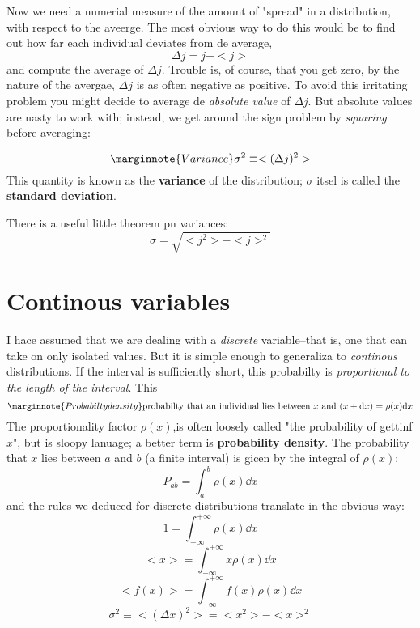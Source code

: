 Now we need a numerial measure of the amount of "spread" in a distribution, with respect to the aveerge. The most obvious way to do this would be to find out how far each individual deviates from de average,
\begin{equation}\label{1.10}
	\Delta j=j-<j>
\end{equation}
and compute the average of $\Delta j$. Trouble is, of course, that you get zero, by the nature of the avergae, $\Delta j$ is as often negative as positive. To avoid this irritating problem you might decide to average de \textit{absolute value} of $\Delta j$. But absolute values are nasty to work with; instead, we get around the sign problem by \textit{squaring} before averaging:

\begin{equation}\label{1.11}\marginnote{Variance}
	\sigma^2\equiv <(\Delta j)^2>
\end{equation}
This quantity is known as the \textbf{variance} of the distribution; $\sigma$ itsel is called the \textbf{standard deviation}. 

There is a useful little theorem pn variances:
\begin{equation}\label{1.12}
	\sigma=\sqrt{<j^2> - <j>^2}
\end{equation}

\section{Continous variables}
I hace assumed that we are dealing with a \textit{discrete} variable--that is, one that can take on only isolated values. But it is simple enough to generaliza to \textit{continous} distributions. If the interval is sufficiently short, this probabilty is \textit{proportional to the length of the interval}. This
\begin{equation}\label{1.14}\marginnote{Probabilty density}
	\mbox{{probabilty that an individual lies between $x$ and $(x+\dd x)$}}=\rho(x)\dd x
\end{equation}
The proportionality factor $\rho(x)$,is often loosely called "the probability of gettinf $x$", but is sloopy lanuage; a better term is \textbf{probability density}. The probability that $x$ lies between $a$ and $b$ (a finite interval) is gicen by the integral of $\rho(x)$:
\begin{equation}\label{1.15}
	P_{ab}=\int_a^b\rho(x)\dd x
\end{equation}
and the rules we deduced for discrete distributions translate in the obvious way:
\begin{equation}\label{1.16}
	1 = \int_{-\infty}^{+\infty}\rho(x)\dd x
\end{equation}
\begin{equation}\label{1.17}
	<x>=\int_{-\infty}^{+\infty}x\rho(x)\dd x
\end{equation}
\begin{equation}\label{1.18}
	<f(x)>=\int_{-\infty}^{+\infty}f(x)\rho(x)\dd x
\end{equation}
\begin{equation}\label{1.19}
	\sigma^2\equiv <(\Delta x)^2>=<x^2>-<x>^2
\end{equation}

